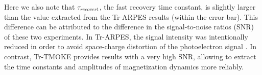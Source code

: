 Here we also note that $\tau_{recover1}$, the fast recovery time constant, is slightly larger than the value extracted from the Tr-ARPES results (within the error bar). This difference can be attributed to the difference in the signal-to-noise ratios (SNR) of these two experiments. In Tr-ARPES, the signal intensity was intentionally reduced in order to avoid space-charge distortion of the photoelectron signal \cite{Tengdin2018}. In contrast, Tr-TMOKE provides results with a very high SNR, allowing to extract the time constants and amplitudes of magnetization dynamics more reliably.